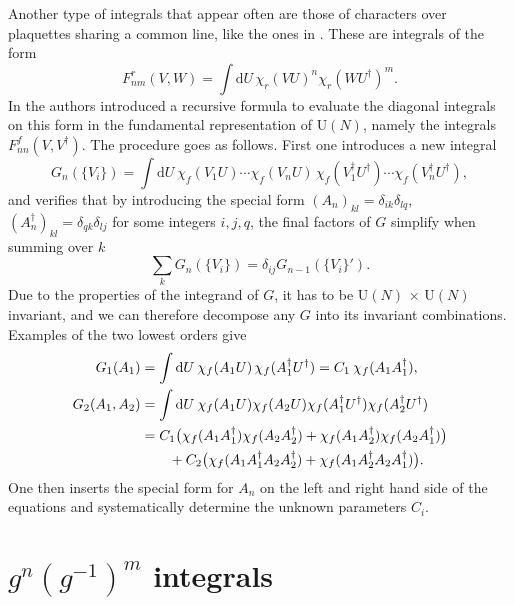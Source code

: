 Another type of integrals that appear often are those of characters over
plaquettes sharing a common line, like the ones in
. These are integrals of the form
%
\begin{equation}
  F_{nm}^r(V,W) = \int \mathrm{d} U \, \chi_r(VU)^n \chi_r(WU^{\dagger})^m.
\end{equation}
%
In \citep{Bars:1979xb} the authors introduced a recursive formula to evaluate
the diagonal integrals on this form in the fundamental representation of U$(N)$,
namely the integrals $F_{nn}^f(V,V^{\dagger})$. The procedure goes as follows. First one
introduces a new integral
%
\begin{equation}
  G_n(\{V_i\}) = \int \mathrm{d} U \> \chi_f(V_1 U) \cdots \chi_f(V_n U) \,
    \chi_f(V_1^{\dagger} U^{\dagger}) \cdots \chi_f(V_n^{\dagger} U^{\dagger}),
\end{equation}
%
and verifies that by introducing the special form $(A_n)_{kl} = \delta_{ik}
\delta_{lq}$, $(A_n^{\dagger})_{kl} = \delta_{qk} \delta_{lj}$ for some integers
$i,j,q$, the final factors of $G$ simplify when summing over $k$
%
\begin{equation}
  {\textstyle\sum_k} G_n(\{V_i\}) = \delta_{ij} G_{n-1}(\{V_i\}').
\end{equation}
%
Due to the properties of the integrand of $G$, it has to be U$(N)$ $\times$
U$(N)$ invariant, and we can therefore decompose any $G$ into its invariant
combinations. Examples of the two lowest orders give
%
\begin{align}
  G_1(A_1) &= \int \mathrm{d} U \> \chi_f(A_1 U) \, \chi_f(A_1^{\dagger} U^{\dagger})
   = C_1 \> \chi_f(A_1 A_1^{\dagger}), \\
  G_2(A_1,A_2) &= \int \mathrm{d} U \> \chi_f(A_1 U) \chi_f(A_2 U) 
  \chi_f(A_1^{\dagger} U^{\dagger}) \chi_f(A_2^{\dagger} U^{\dagger})  \nonumber \\
  &= C_1 \big( \chi_f(A_1 A_1^{\dagger}) \chi_f(A_2 A_2^{\dagger}) + \chi_f(A_1
  A_2^{\dagger}) \chi_f(A_2 A_1^{\dagger})\big) \nonumber \\
  &\hskip2em+ C_2 \big(\chi_f(A_1 A_1^{\dagger} A_2 A_2^{\dagger})
  + \chi_f(A_1 A_2^{\dagger} A_2 A_1^{\dagger}) \big).
\end{align}
%
One then inserts the special form for $A_n$ on the left and right hand side of
the equations and systematically determine the unknown parameters $C_i$.

\section{\texorpdfstring{$g^n (g^{-1})^m$}{Un Udm} integrals} \label{sec:sun_integrals}

